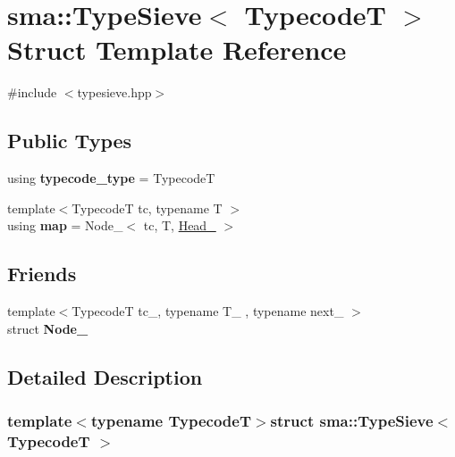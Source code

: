 \hypertarget{structsma_1_1TypeSieve}{\section{sma\-:\-:Type\-Sieve$<$ Typecode\-T $>$ Struct Template Reference}
\label{structsma_1_1TypeSieve}
}


{\ttfamily \#include $<$typesieve.\-hpp$>$}

\subsection*{Public Types}
\begin{DoxyCompactItemize}
\item 
\hypertarget{structsma_1_1TypeSieve_a0a0061ea1f4e27f3e8545fd42d285302}{using {\bfseries typecode\-\_\-type} = Typecode\-T}\label{structsma_1_1TypeSieve_a0a0061ea1f4e27f3e8545fd42d285302}

\item 
\hypertarget{structsma_1_1TypeSieve_a7b01713535beb4ed5fc132b7959aac43}{{\footnotesize template$<$Typecode\-T tc, typename T $>$ }\\using {\bfseries map} = Node\-\_\-$<$ tc, T, \hyperlink{structsma_1_1TypeSieve}{Head\-\_\-} $>$}\label{structsma_1_1TypeSieve_a7b01713535beb4ed5fc132b7959aac43}

\end{DoxyCompactItemize}
\subsection*{Friends}
\begin{DoxyCompactItemize}
\item 
\hypertarget{structsma_1_1TypeSieve_ae599961800b61533f20f710b4f425dc5}{{\footnotesize template$<$Typecode\-T tc\-\_\-, typename T\-\_\- , typename next\-\_\- $>$ }\\struct {\bfseries Node\-\_\-}}\label{structsma_1_1TypeSieve_ae599961800b61533f20f710b4f425dc5}

\end{DoxyCompactItemize}


\subsection{Detailed Description}
\subsubsection*{template$<$typename Typecode\-T$>$struct sma\-::\-Type\-Sieve$<$ Typecode\-T $>$}

